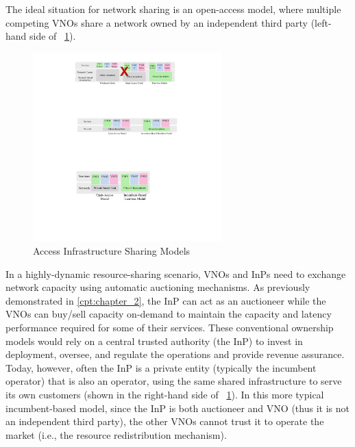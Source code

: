 The ideal situation for network sharing is an open-access model, where multiple competing \acp{VNO} share a network owned by an independent third party (left-hand side of \figureautorefname~\ref{Fig_access}).
\begin{figure}%
  \centering
  \includegraphics[width=0.65\textwidth]{Figures/ICBC-ownership.pdf}
\caption{Access Infrastructure Sharing Models}
\label{Fig_access}
\end{figure}
In a highly-dynamic resource-sharing scenario, \acp{VNO} and \acp{InP} need to exchange network capacity using automatic auctioning mechanisms. As previously demonstrated in \autoref{cpt:chapter_2}, the \ac{InP} can act as an auctioneer while the \acp{VNO} can buy/sell capacity on-demand to maintain the capacity and latency performance required for some of their services. 
These conventional ownership models would rely on a central trusted authority (the \ac{InP}) to invest in deployment, oversee, and regulate the operations and provide revenue assurance. 
Today, however, often the \ac{InP} is a private entity (typically the incumbent operator) that is also an operator, using the same shared infrastructure to serve its own customers (shown in the right-hand side of \figureautorefname~\ref{Fig_access}). In this more typical incumbent-based model, since the \ac{InP} is both auctioneer and \ac{VNO} (thus it is not an independent third party), the other \acp{VNO} cannot trust it to operate the market (i.e., the resource redistribution mechanism).


